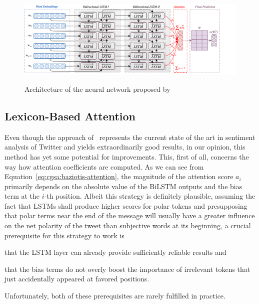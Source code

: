 \begin{figure}[htbp!]
{
  \centering
  \includegraphics[width=\linewidth]{img/baziotis.png}
}
\caption[Neural network of \citet{Baziotis:17}]{Architecture of the
  neural network proposed
  by~\citet{Baziotis:17}}\label{cgsa:fig:baziotis}
\end{figure}

\subsection{Lexicon-Based Attention}

Even though the approach of~\citet{Baziotis:17} represents the current
state of the art in sentiment analysis of Twitter and yields
extraordinarily good results, in our opinion, this method has yet some
potential for improvements.  This, first of all, concerns the way how
attention coefficients are computed.  As we can see from
Equation~\ref{eq:cgsa:baziotis-attention}, the magnitude of the
attention score $a_i$ primarily depends on the absolute value of the
BiLSTM outputs and the bias term at the $i$-th position.  Albeit this
strategy is definitely plausible, assuming the fact that LSTMs shall
produce higher scores for polar tokens and presupposing that polar
terms near the end of the message will usually have a greater
influence on the net polarity of the tweet than subjective words at
its beginning, a crucial prerequisite for this strategy to work is
\begin{inparaenum}[(i)]
\item that the LSTM layer can already provide sufficiently reliable
  results and
\item that the bias terms do not overly boost the importance of
  irrelevant tokens that just accidentally appeared at favored
  positions.
\end{inparaenum}
Unfortunately, both of these prerequisites are rarely fulfilled in
practice.

